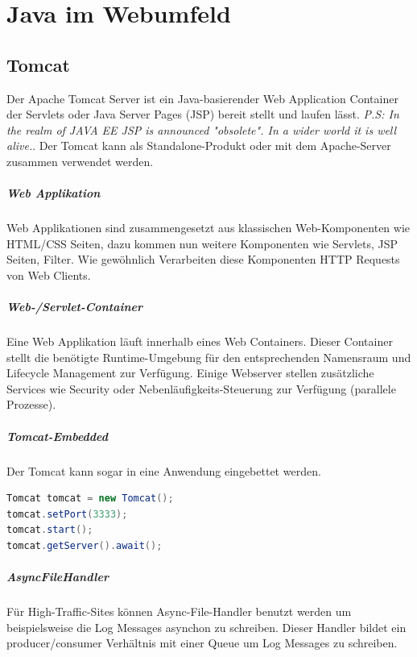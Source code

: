 \chapter{Java im Webumfeld}

\section{Tomcat}
Der Apache Tomcat Server ist ein Java-basierender Web Application Container der Servlets oder Java Server Pages (JSP) bereit stellt und laufen lässt. \emph{P.S: In the realm of JAVA EE JSP is announced "obsolete". In a wider world it is well alive.}. Der Tomcat kann als Standalone-Produkt oder mit dem Apache-Server zusammen verwendet werden.

\paragraph{Web Applikation}
Web Applikationen sind zusammengesetzt aus klassischen Web-Komponenten wie HTML/CSS Seiten, dazu kommen nun weitere Komponenten wie Servlets, JSP Seiten, Filter. Wie gewöhnlich Verarbeiten diese Komponenten HTTP Requests von Web Clients.

\paragraph{Web-/Servlet-Container}
Eine Web Applikation läuft innerhalb eines Web Containers. Dieser Container stellt die benötigte Runtime-Umgebung für den entsprechenden Namensraum und Lifecycle Management zur Verfügung. Einige Webserver stellen zusätzliche Services wie Security oder Nebenläufigkeits-Steuerung zur Verfügung (parallele Prozesse).

\paragraph{Tomcat-Embedded}
Der Tomcat kann sogar in eine Anwendung eingebettet werden.

\begin{lstlisting}[language=Java]
Tomcat tomcat = new Tomcat();
tomcat.setPort(3333);
tomcat.start();
tomcat.getServer().await();
\end{lstlisting}

\paragraph{AsyncFileHandler}
Für High-Traffic-Sites können Async-File-Handler benutzt werden um beispielsweise die Log Messages asynchon zu schreiben. Dieser Handler bildet ein producer/consumer Verhältnis mit einer Queue um Log Messages zu schreiben.

